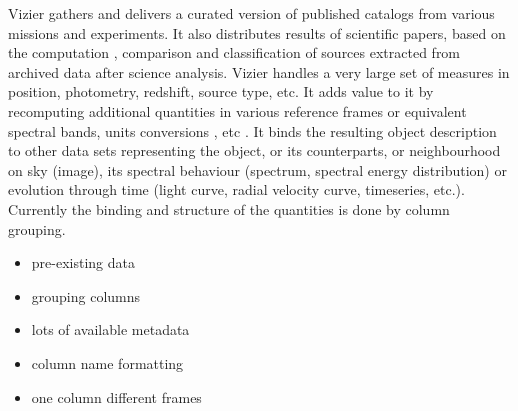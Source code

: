 \documentclass[11pt,a4paper]{ivoa}
\begin{document}
%
%
%
%
%
%


Vizier gathers and delivers a curated version of published catalogs from various missions and experiments.
It also distributes results of scientific papers, based on the computation , comparison and classification of sources extracted from archived data after science analysis.
Vizier handles a very large set of measures in position, photometry, redshift, source type, etc.
It adds value to it by recomputing additional quantities in various reference frames or equivalent spectral bands, units conversions , etc .
It binds the resulting object description to other data sets representing the object, or its counterparts, or neighbourhood on sky (image), its spectral behaviour (spectrum, spectral energy distribution) or evolution through time (light curve, radial velocity curve, timeseries, etc.).
Currently the binding and structure of the quantities is done by column grouping.
\begin{itemize}
    \item pre-existing data
    \item grouping columns
    \item lots of available metadata
    \item column name formatting
    \item one column different frames
\end{itemize}
\end{document}
